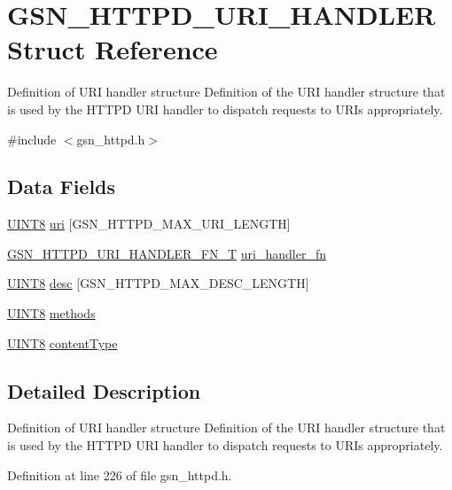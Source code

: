 \hypertarget{a00097}{
\section{GSN\_\-HTTPD\_\-URI\_\-HANDLER Struct Reference}
\label{a00097}
}


Definition of URI handler structure Definition of the URI handler structure that is used by the HTTPD URI handler to dispatch requests to URIs appropriately.  




{\ttfamily \#include $<$gsn\_\-httpd.h$>$}

\subsection*{Data Fields}
\begin{DoxyCompactItemize}
\item 
\hyperlink{a00660_gab27e9918b538ce9d8ca692479b375b6a}{UINT8} \hyperlink{a00097_a28a8e8ca2b3ff3e8a7ea486b4ee4cc10}{uri} \mbox{[}GSN\_\-HTTPD\_\-MAX\_\-URI\_\-LENGTH\mbox{]}
\item 
\hyperlink{a00666_ga37351c58635a4a2a10675d5ea28e37be}{GSN\_\-HTTPD\_\-URI\_\-HANDLER\_\-FN\_\-T} \hyperlink{a00097_a27843141a322f5a72297928e7259f180}{uri\_\-handler\_\-fn}
\item 
\hyperlink{a00660_gab27e9918b538ce9d8ca692479b375b6a}{UINT8} \hyperlink{a00097_a6d9946120691f74b3172239aefadfea2}{desc} \mbox{[}GSN\_\-HTTPD\_\-MAX\_\-DESC\_\-LENGTH\mbox{]}
\item 
\hyperlink{a00660_gab27e9918b538ce9d8ca692479b375b6a}{UINT8} \hyperlink{a00097_ad3a8760dd52aef4c629a6c6ee61e4017}{methods}
\item 
\hyperlink{a00660_gab27e9918b538ce9d8ca692479b375b6a}{UINT8} \hyperlink{a00097_ad528c260b261812c469bf838902b01bf}{contentType}
\end{DoxyCompactItemize}


\subsection{Detailed Description}
Definition of URI handler structure Definition of the URI handler structure that is used by the HTTPD URI handler to dispatch requests to URIs appropriately. 

Definition at line 226 of file gsn\_\-httpd.h.



